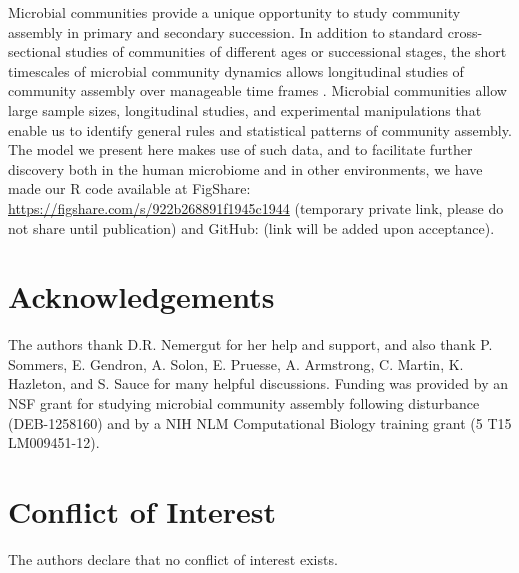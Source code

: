 \documentclass{article}
\begin{document}
\par
Microbial communities provide a unique opportunity to study community assembly in primary and secondary succession. In addition to standard cross-sectional studies of communities of different ages or successional stages, the short timescales of microbial community dynamics allows longitudinal studies of community assembly over manageable time frames \cite{David2014,Kennedy2016}. Microbial communities allow large sample sizes, longitudinal studies, and experimental manipulations that enable us to identify general rules and statistical patterns of community assembly. The model we present here makes use of such data, and to facilitate further discovery both in the human microbiome and in other environments, we have made our R code available at FigShare: \url{https://figshare.com/s/922b268891f1945c1944} (temporary private link, please do not share until publication) and GitHub: (link will be added upon acceptance).

\section{Acknowledgements}
The authors thank D.R. Nemergut for her help and support, and also thank P. Sommers, E. Gendron, A. Solon, E. Pruesse, A. Armstrong, C. Martin, K. Hazleton, and S. Sauce for many helpful discussions. Funding was provided by an NSF grant for studying microbial community assembly following disturbance (DEB-1258160) and by a NIH NLM Computational Biology training grant (5 T15 LM009451-12).

\section{Conflict of Interest}
The authors declare that no conflict of interest exists.



\newpage
\end{document}
